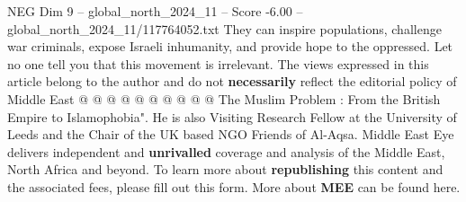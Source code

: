 \begin{textsample}{NEG Dim 9 – global\_north\_2024\_11 – Score -6.00 – global\_north\_2024\_11/117764052.txt}
They can inspire populations, challenge war criminals, expose Israeli inhumanity, and provide hope to the oppressed.
Let no one tell you that this movement is irrelevant.
The views expressed in this article belong to the author and do not \textbf{necessarily} reflect the editorial policy of Middle East @ @ @ @ @ @ @ @ @ @ The Muslim Problem : From the British Empire to Islamophobia".
He is also Visiting Research Fellow at the University of Leeds and the Chair of the UK based NGO Friends of Al-Aqsa.
Middle East Eye delivers independent and \textbf{unrivalled} coverage and analysis of the Middle East, North Africa and beyond.
To learn more about \textbf{republishing} this content and the associated fees, please fill out this form.
More about \textbf{MEE} can be found here.

\end{textsample}

